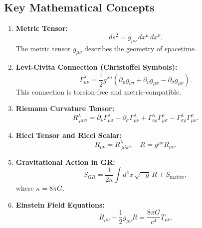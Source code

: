 \documentclass{article}
\begin{document}
\subsection*{Key Mathematical Concepts}

\begin{enumerate}
    \item \textbf{Metric Tensor:}
    \begin{equation}
        ds^2 = g_{\mu\nu} \, dx^\mu \, dx^\nu.
    \end{equation}
    The metric tensor $g_{\mu\nu}$ describes the geometry of spacetime.

    \item \textbf{Levi-Civita Connection (Christoffel Symbols):}
    \begin{equation}
        \Gamma^\lambda_{\mu\nu} = \frac{1}{2} g^{\lambda\sigma} \left( \partial_\mu g_{\nu\sigma} + \partial_\nu g_{\mu\sigma} - \partial_\sigma g_{\mu\nu} \right).
    \end{equation}
    This connection is torsion-free and metric-compatible.

    \item \textbf{Riemann Curvature Tensor:}
    \begin{equation}
        R^\lambda_{\ \mu\nu\sigma} = \partial_\nu \Gamma^\lambda_{\mu\sigma} - \partial_\sigma \Gamma^\lambda_{\mu\nu} + \Gamma^\lambda_{\nu\rho} \Gamma^\rho_{\mu\sigma} - \Gamma^\lambda_{\sigma\rho} \Gamma^\rho_{\mu\nu}.
    \end{equation}

    \item \textbf{Ricci Tensor and Ricci Scalar:}
    \begin{equation}
        R_{\mu\nu} = R^\lambda_{\ \mu\lambda\nu}, \quad R = g^{\mu\nu} R_{\mu\nu}.
    \end{equation}

    \item \textbf{Gravitational Action in GR:}
    \begin{equation}
        S_{GR} = \frac{1}{2\kappa} \int d^4x \, \sqrt{-g} \, R + S_\text{matter},
    \end{equation}
    where $\kappa = 8\pi G$.

    \item \textbf{Einstein Field Equations:}
    \begin{equation}
        R_{\mu\nu} - \frac{1}{2} g_{\mu\nu} R = \frac{8\pi G}{c^4} T_{\mu\nu}.
    \end{equation}
\end{enumerate}
\end{document}
